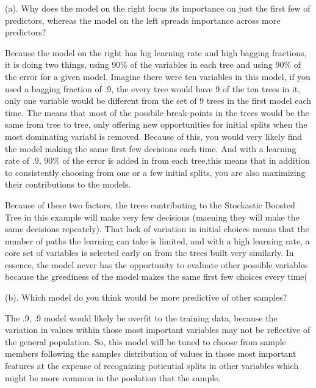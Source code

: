 \documentclass[]{report}
\begin{document}
\begin{subquestion}{(a).} Why does the model on the right focus its importance on just the first few of predictors, whereas the model on the left spreads importance across more predictors? \end{subquestion}

Because the model on the right has hig learning rate and high bagging
fractions, it is doing two things, using 90\% of the variables in each
tree and using 90\% of the error for a given model. Imagine there were
ten variables in this model, if you used a bagging fraction of .9, the
every tree would have 9 of the ten trees in it, only one variable would
be different from the set of 9 trees in the first model each time. The
means that most of the possbile break-points in the trees would be the
same from tree to tree, only offering new opportunities for initial
splits when the most dominating variabl is removed. Because of this, you
would very likely find the model making the same first few decisions
each time. And with a learning rate of .9, 90\% of the error is added in
from each tree,this means that in addition to consistently choosing from
one or a few initial splits, you are also maximizing their contributions
to the models.

Because of these two factors, the trees contributing to the Stockastic
Boosted Tree in this example will make very few decisions (maening they
will make the same decisions repeately). That lack of variation in
initial choices means that the number of paths the learning can take is
limited, and with a high learning rate, a core set of variables is
selected early on from the trees built very similarly. In essence, the
model never has the opportunity to evaluate other possible variables
because the greediness of the model makes the same first few choices
every time(

\begin{subquestion}{(b).} Which model do you think would be more predictive of other samples?\end{subquestion}

The .9, .9 model would likely be overfit to the training data, because
the variation in values within those most important variables may not be
reflective of the general population. So, this model will be tuned to
choose from sample members following the samples distribution of values
in those most important features at the expense of recognizing
potiential splits in other variables which might be more common in the
poolation that the sample.
\end{document}

